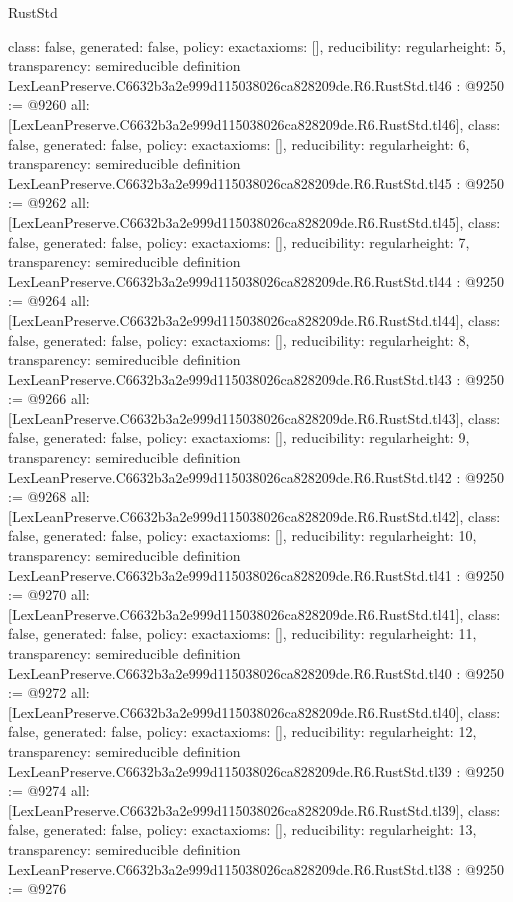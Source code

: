 \begin{lexlean}{RustStd}
\begin{coremodule}
{  class: false,
  generated: false,
  policy: exact{axioms: []},
  reducibility: regular{height: 5},
  transparency: semireducible
}
definition LexLeanPreserve.C6632b3a2e999d115038026ca828209de.R6.RustStd.tl46 : @9250 := @9260 {
  all: [LexLeanPreserve.C6632b3a2e999d115038026ca828209de.R6.RustStd.tl46],
  class: false,
  generated: false,
  policy: exact{axioms: []},
  reducibility: regular{height: 6},
  transparency: semireducible
}
definition LexLeanPreserve.C6632b3a2e999d115038026ca828209de.R6.RustStd.tl45 : @9250 := @9262 {
  all: [LexLeanPreserve.C6632b3a2e999d115038026ca828209de.R6.RustStd.tl45],
  class: false,
  generated: false,
  policy: exact{axioms: []},
  reducibility: regular{height: 7},
  transparency: semireducible
}
definition LexLeanPreserve.C6632b3a2e999d115038026ca828209de.R6.RustStd.tl44 : @9250 := @9264 {
  all: [LexLeanPreserve.C6632b3a2e999d115038026ca828209de.R6.RustStd.tl44],
  class: false,
  generated: false,
  policy: exact{axioms: []},
  reducibility: regular{height: 8},
  transparency: semireducible
}
definition LexLeanPreserve.C6632b3a2e999d115038026ca828209de.R6.RustStd.tl43 : @9250 := @9266 {
  all: [LexLeanPreserve.C6632b3a2e999d115038026ca828209de.R6.RustStd.tl43],
  class: false,
  generated: false,
  policy: exact{axioms: []},
  reducibility: regular{height: 9},
  transparency: semireducible
}
definition LexLeanPreserve.C6632b3a2e999d115038026ca828209de.R6.RustStd.tl42 : @9250 := @9268 {
  all: [LexLeanPreserve.C6632b3a2e999d115038026ca828209de.R6.RustStd.tl42],
  class: false,
  generated: false,
  policy: exact{axioms: []},
  reducibility: regular{height: 10},
  transparency: semireducible
}
definition LexLeanPreserve.C6632b3a2e999d115038026ca828209de.R6.RustStd.tl41 : @9250 := @9270 {
  all: [LexLeanPreserve.C6632b3a2e999d115038026ca828209de.R6.RustStd.tl41],
  class: false,
  generated: false,
  policy: exact{axioms: []},
  reducibility: regular{height: 11},
  transparency: semireducible
}
definition LexLeanPreserve.C6632b3a2e999d115038026ca828209de.R6.RustStd.tl40 : @9250 := @9272 {
  all: [LexLeanPreserve.C6632b3a2e999d115038026ca828209de.R6.RustStd.tl40],
  class: false,
  generated: false,
  policy: exact{axioms: []},
  reducibility: regular{height: 12},
  transparency: semireducible
}
definition LexLeanPreserve.C6632b3a2e999d115038026ca828209de.R6.RustStd.tl39 : @9250 := @9274 {
  all: [LexLeanPreserve.C6632b3a2e999d115038026ca828209de.R6.RustStd.tl39],
  class: false,
  generated: false,
  policy: exact{axioms: []},
  reducibility: regular{height: 13},
  transparency: semireducible
}
definition LexLeanPreserve.C6632b3a2e999d115038026ca828209de.R6.RustStd.tl38 : @9250 := @9276 {
}
\end{coremodule}
\end{lexlean}
